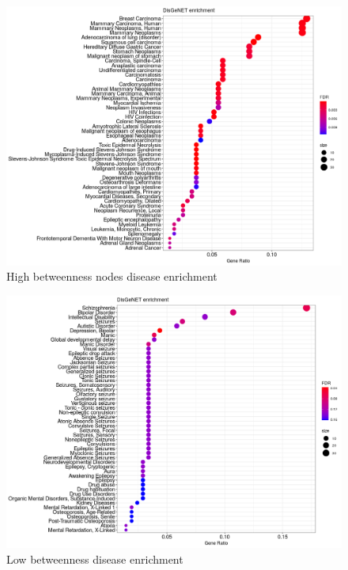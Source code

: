\begin{figure}
    \centering
    \includegraphics[width=\textwidth]{images/Rplot_high_bet_disgen.png}
    \caption{High betweenness nodes disease enrichment}
    \label{fig:high betweenness disease enrichment}
\end{figure}

\begin{figure}
    \centering
    \includegraphics[width=\textwidth]{images/Rplot_bet_low0.1.png}
    \caption{Low betweenness disease enrichment}
    \label{fig:low betweenness disease enrichment}
\end{figure}




